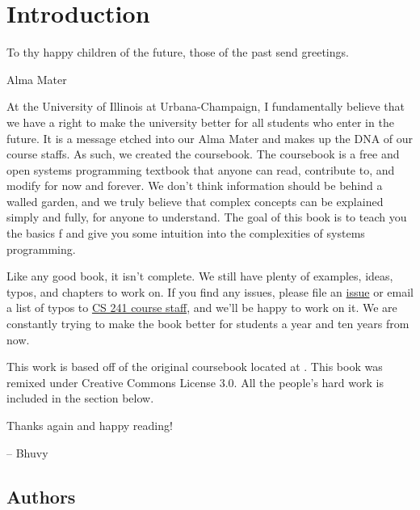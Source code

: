 \chapter{Introduction}

\epigraph{To thy happy children of the future, those of the past send greetings.}{Alma Mater}

At the University of Illinois at Urbana-Champaign, I fundamentally believe that we have a right to make the university better for all students who enter in the future.
It is a message etched into our Alma Mater and makes up the DNA of our course staffs.
As such, we created the coursebook.
The coursebook is a free and open systems programming textbook that anyone can read, contribute to, and modify for now and forever.
We don't think information should be behind a walled garden, and we truly believe that complex concepts can be explained simply and fully, for anyone to understand.
The goal of this book is to teach you the basics f and give you some intuition into the complexities of systems programming.

Like any good book, it isn't complete.
We still have plenty of examples, ideas, typos, and chapters to work on.
If you find any issues, please file an \href{https://github.com/illinois-cs241/coursebook/issues}{issue} or email a list of typos to \href{http://cs241.cs.illinois.edu/staff}{CS 241 course staff}, and we'll be happy to work on it.
We are constantly trying to make the book better for students a year and ten years from now.

This work is based off of the original coursebook located at .
This book was remixed under Creative Commons License 3.0.
All the people's hard work is included in the section below.

Thanks again and happy reading!

-- Bhuvy

\section{Authors}



